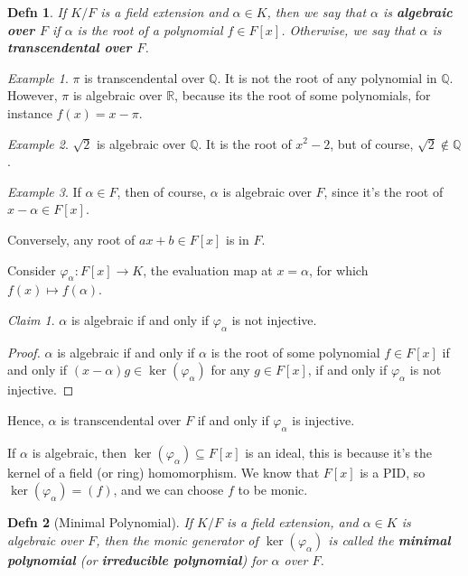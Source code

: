 \documentclass[12pt]{article}
\def\Q{{\mathbb Q}}
\def\R{{\mathbb R}}
\newtheorem{definition}{Defn}
\theoremstyle{remark}
\theoremstyle{remark}
\newtheorem{claim}{Claim}
\theoremstyle{remark}
\newtheorem{example}{Example}
\theoremstyle{remark}
\theoremstyle{remark}
\begin{document}
\begin{definition}
  If $K / F$ is a field extension and $\alpha \in K$, then we say that $\alpha$
  is {\bf algebraic over $F$} if $\alpha$ is the root of a polynomial $f \in
  F[x]$. Otherwise, we say that $\alpha$ is {\bf transcendental over $F$}.
\end{definition}

\begin{example}
  $\pi$ is transcendental over $\Q$. It is not the root of any polynomial in
  $\Q$. However, $\pi$ is algebraic over $\R$, because its the root of some
  polynomials, for instance $f(x) = x - \pi$.
\end{example}

\begin{example}
  $\sqrt{2}$ is algebraic over $\Q$. It is the root of $x^2 - 2$, but of course,
  $\sqrt{2} \not\in \Q$.
\end{example}

\begin{example}
  If $\alpha \in F$, then of course, $\alpha$ is algebraic over $F$, since it's
  the root of $x - \alpha \in F[x]$.

  Conversely, any root of $ax + b \in F[x]$ is in $F$.
\end{example}

Consider $\varphi_{\alpha} : F[x] \to K$, the evaluation map at $x = \alpha$,
for which $f(x) \mapsto f(\alpha)$.

\begin{claim}
  $\alpha$ is algebraic if and only if $\varphi_{\alpha}$ is not injective.
\end{claim}

\begin{proof}
  $\alpha$ is algebraic if and only if $\alpha$ is the root of some polynomial
  $f \in F[x]$ if and only if $(x - \alpha)g \in \ker(\varphi_{\alpha})$ for any
  $g \in F[x]$, if and only if $\varphi_{\alpha}$ is not injective.
\end{proof}

Hence, $\alpha$ is transcendental over $F$ if and only if $\varphi_{\alpha}$ is
injective.

If $\alpha$ is algebraic, then $\ker(\varphi_{\alpha}) \subseteq F[x]$ is an
ideal, this is because it's the kernel of a field (or ring) homomorphism. We
know that $F[x]$ is a PID, so $\ker(\varphi_{\alpha}) = (f)$, and we can choose
$f$ to be monic.

\begin{definition}[Minimal Polynomial]
  If $K / F$ is a field extension, and $\alpha \in K$ is algebraic over $F$,
  then the monic generator of $\ker(\varphi_{\alpha})$ is called the {\bf
  minimal polynomial} (or {\bf irreducible polynomial}) for $\alpha$ over $F$.
\end{definition}
\end{document}
